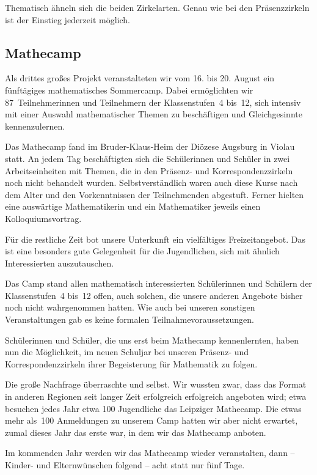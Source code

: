 \documentclass[12pt]{zettel}
\begin{document}
Thematisch ähneln sich die beiden Zirkelarten. Genau wie bei den
Präsenzzirkeln ist der Einstieg jederzeit möglich.


\subsection{Mathecamp}

Als drittes großes Projekt veranstalteten wir vom 16. bis 20. August ein fünftägiges
mathematisches Sommercamp. Dabei ermöglichten wir 87~Teilnehmerinnen
und Teilnehmern der Klassenstufen~4 bis~12, sich intensiv mit einer Auswahl
mathematischer Themen zu beschäftigen und Gleichgesinnte kennenzulernen.

Das Mathecamp fand im Bruder-Klaus-Heim der Diözese Augsburg in Violau statt.
An jedem Tag beschäftigten sich die Schülerinnen und Schüler in zwei
Arbeitseinheiten mit Themen, die in den Präsenz- und Korrespondenzzirkeln noch
nicht behandelt wurden. Selbstverständlich waren auch diese Kurse nach dem Alter
und den Vorkenntnissen der Teilnehmenden abgestuft. Ferner
hielten eine auswärtige Mathematikerin und ein Mathematiker jeweils einen
Kolloquiumsvortrag.

Für die restliche Zeit bot unsere Unterkunft ein vielfältiges
Freizeitangebot. Das ist eine besonders gute Gelegenheit für die Jugendlichen,
sich mit ähnlich Interessierten auszutauschen.

Das Camp stand allen mathematisch interessierten Schülerinnen und Schülern der
Klassenstufen~4 bis~12 offen, auch solchen, die unsere anderen Angebote bisher
noch nicht wahrgenommen hatten. Wie auch bei unseren sonstigen Veranstaltungen
gab es keine formalen Teilnahmevoraussetzungen.

Schülerinnen und Schüler, die uns erst beim Mathecamp kennenlernten, haben nun
die Möglichkeit, im neuen Schuljar bei unseren Präsenz- und Korrespondenzzirkeln
ihrer Begeisterung für Mathematik zu folgen.

Die große Nachfrage überraschte und selbst. Wir wussten zwar, dass das
Format in anderen Regionen seit langer Zeit erfolgreich erfolgreich angeboten
wird; etwa besuchen jedes Jahr etwa 100 Jugendliche das Leipziger Mathecamp.
Die etwas mehr als~100 Anmeldungen zu unserem Camp hatten wir aber nicht
erwartet, zumal dieses Jahr das erste war, in dem wir das Mathecamp anboten.

Im kommenden Jahr werden wir das Mathecamp wieder veranstalten, dann -- Kinder-
und Elternwünschen folgend -- acht statt nur fünf Tage.
\end{document}
